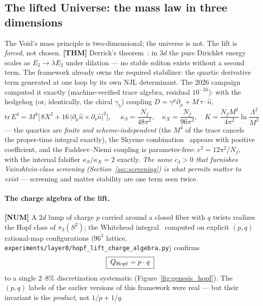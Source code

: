 \subsection{The lifted Universe: the mass law in three dimensions}
\label{sec:genesis-lift}

The Void's mass principle is two-dimensional; the universe is not. The lift is \emph{forced},
not chosen. \textbf{[THM]} Derrick's theorem~\cite{derrick1964}: in $3d$ the pure Dirichlet energy scales as
$E_2\to\lambda E_2$ under dilation --- no stable soliton exists without a second term.
The framework already owns the required stabilizer: the quartic derivative term generated at
one loop by its own NJL determinant. The 2026 campaign computed it exactly
(machine-verified trace algebra, residual $10^{-24}$): with the hedgehog (or, identically,
the chiral $\gamma_5$) coupling $D=\gamma^\mu\partial_\mu + M\,\tau\!\cdot\!\hat n$,
\begin{equation}
\mathrm{tr}\,E^4 = M^4\Big[\,8X^2 + 16\,\big|\partial_\mu \hat n\times\partial_\nu \hat n\big|^2\Big],
\quad
\boxed{\;\kappa_S=\frac{N_f}{48\pi^2},\quad \kappa_X=\frac{N_f}{96\pi^2},\quad
K=\frac{N_f M^2}{4\pi^2}\ln\frac{\Lambda^2}{M^2}\;}
\label{eq:njlquartic}
\end{equation}
--- the quartics are \emph{finite and scheme-independent} (the $M^4$ of the trace cancels the
proper-time integral exactly), the Skyrme combination~\cite{skyrme1961} appears with positive coefficient, and
the Faddeev--Niemi coupling is parameter-free: $e^2=12\pi^2/N_f$, with the internal falsifier
$\kappa_S/\kappa_X=2$ exactly. \emph{The same $c_4>0$ that furnishes Vainshtein-class
screening (Section~\ref{sec:screening}) is what permits matter to exist} --- screening and
matter stability are one term seen twice.

\paragraph{The charge algebra of the lift.} \textbf{[NUM]} A $2d$ lump of charge $p$ carried
around a closed fiber with $q$ twists realizes the Hopf class of $\pi_3(S^2)$; the Whitehead
integral~\cite{whitehead1947} computed on explicit $(p,q)$ rational-map configurations ($96^3$ lattice,
\texttt{experiments/\allowbreak layer0/\allowbreak hopf\_\allowbreak lift\_\allowbreak charge\_\allowbreak algebra.py}) confirms
\begin{equation}
\boxed{\;Q_{\rm Hopf}=p\cdot q\;}
\end{equation}
to a single $2\text{--}8\%$ discretization systematic (Figure~\ref{fig:genesis_hopf}). The $(p,q)$ labels of the earlier
versions of this framework were real --- but their invariant is the \emph{product}, not
$1/p+1/q$.

